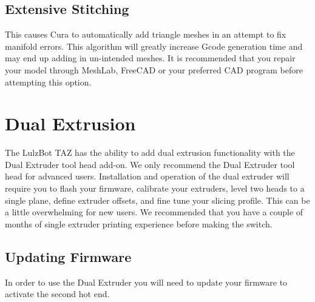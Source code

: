 \subsection{Extensive Stitching}
This causes Cura to automatically add triangle meshes in an attempt to fix manifold errors. This algorithm will greatly increase Gcode generation time and may end up adding in un-intended meshes. It is recommended that you repair your model through MeshLab, FreeCAD or your preferred CAD program before attempting this option.

\section{Dual Extrusion}
The LulzBot TAZ has the ability to add dual extrusion functionality with the Dual Extruder tool head add-on. We only recommend the Dual Extruder tool head for advanced users. Installation and operation of the dual extruder will require you to flash your firmware, calibrate your extruders, level two heads to a single plane, define extruder offsets, and fine tune your slicing profile. This can be a little overwhelming for new users. We recommended that you have a couple of months of single extruder printing experience before making the switch.

\subsection{Updating Firmware}
In order to use the Dual Extruder you will need to update your firmware to activate the second hot end.

